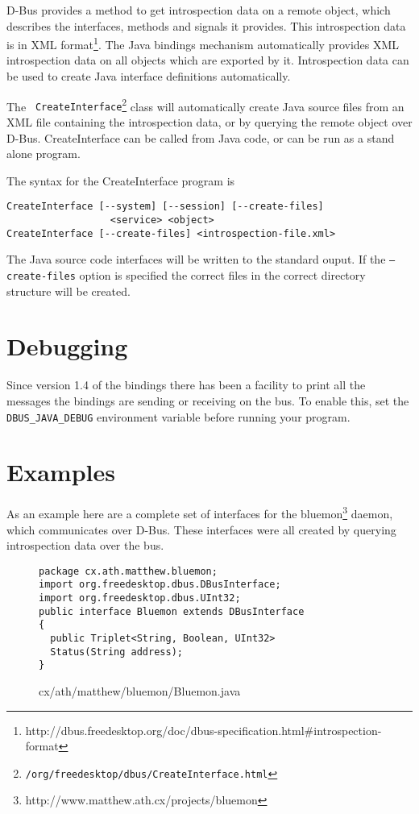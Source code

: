 \documentclass[a4paper,12pt]{article}
\begin{document}
D-Bus provides a method to get introspection data on a remote object,
which describes the interfaces, methods and signals it provides.
This introspection data is in XML
format\footnote{http://dbus.freedesktop.org/doc/dbus-specification.html\#introspection-format}.
The Java bindings mechanism automatically provides XML introspection data on all
objects which are exported by it.  Introspection data can be used to create
Java interface definitions automatically.

The {\tt
CreateInterface\footnote{\javadocroot/org/freedesktop/dbus/CreateInterface.html}}
class will automatically create Java source files from an XML file
containing the introspection data, or by querying the remote object
over D-Bus.  CreateInterface can be called from Java code, or can be run as a
stand alone program.  

The syntax for the CreateInterface program is

\begin{verbatim}
CreateInterface [--system] [--session] [--create-files] 
                  <service> <object>
CreateInterface [--create-files] <introspection-file.xml>
\end{verbatim}

The Java source code interfaces will be written to the standard ouput. If the
{\tt --create-files} option is specified the correct files in the
correct directory structure will be created.

\section{Debugging}

Since version 1.4 of the bindings there has been a facility to print all the
messages the bindings are sending or receiving on the bus. To enable this, set
the {\tt DBUS\_JAVA\_DEBUG} environment variable before running your program.

\section{Examples}

As an example here are a complete set of interfaces for the
bluemon\footnote{http://www.matthew.ath.cx/projects/bluemon} daemon,
which communicates over D-Bus. These interfaces were all created by
querying introspection data over the bus.

\newpage

\begin{figure}[!h]
\begin{center}
\begin{verbatim}
package cx.ath.matthew.bluemon;
import org.freedesktop.dbus.DBusInterface;
import org.freedesktop.dbus.UInt32;
public interface Bluemon extends DBusInterface
{
  public Triplet<String, Boolean, UInt32> 
  Status(String address);
}
\end{verbatim}
\end{center}
\caption{cx/ath/matthew/bluemon/Bluemon.java}
\end{figure}
\end{document}
